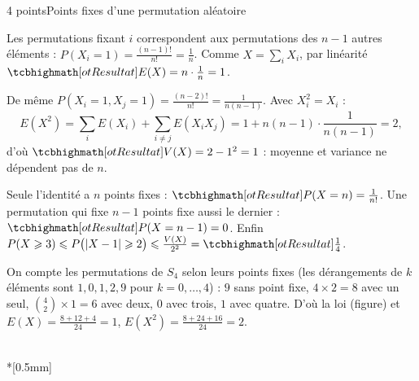 

\begin{corrigeEval}{4 points}{Points fixes d'une permutation aléatoire}
\begin{questions}
  \item Les permutations fixant $i$ correspondent aux permutations des
    $n-1$ autres éléments : $P(X_i=1)=\frac{(n-1)!}{n!}=\frac1n$. Comme
    $X=\sum_iX_i$, par linéarité $\res{E(X)=n\cdot\frac1n=1}$. \pts{1 pt}
  \item De même $P(X_i=1,X_j=1)=\frac{(n-2)!}{n!}=\frac{1}{n(n-1)}$. Avec
    $X_i^{2}=X_i$ :
    \[E(X^{2})=\sum_{i}E(X_i)+\sum_{i\neq j}E(X_iX_j)=1+n(n-1)\cdot\frac{1}{n(n-1)}=2,\]
    d'où $\res{V(X)=2-1^{2}=1}$ : moyenne et variance ne dépendent pas de $n$.
  \item Seule l'identité a $n$ points fixes : $\res{P(X=n)=\frac{1}{n!}}$. Une
    permutation qui fixe $n-1$ points fixe aussi le dernier :
    $\res{P(X=n-1)=0}$. Enfin
    $P(X\geqslant3)\leqslant P\bigl(|X-1|\geqslant2\bigr)\leqslant\frac{V(X)}{2^{2}}=\res{\frac14}$.
    \pts{1 pt}
  \item On compte les permutations de $S_4$ selon leurs points fixes (les
    dérangements de $k$ éléments sont $1,0,1,2,9$ pour $k=0,\dots,4$) :
    $9$ sans point fixe, $4\times2=8$ avec un seul, $\binom42\times1=6$ avec
    deux, $0$ avec trois, $1$ avec quatre. D'où la loi (figure) et
    $E(X)=\frac{8+12+4}{24}=1$, $E(X^{2})=\frac{8+24+16}{24}=2$.
\end{questions}
\begin{center}\begin{minipage}{\linewidth}\centering
{}\\*[0.5mm]
\end{minipage}\end{center}
\end{corrigeEval}

